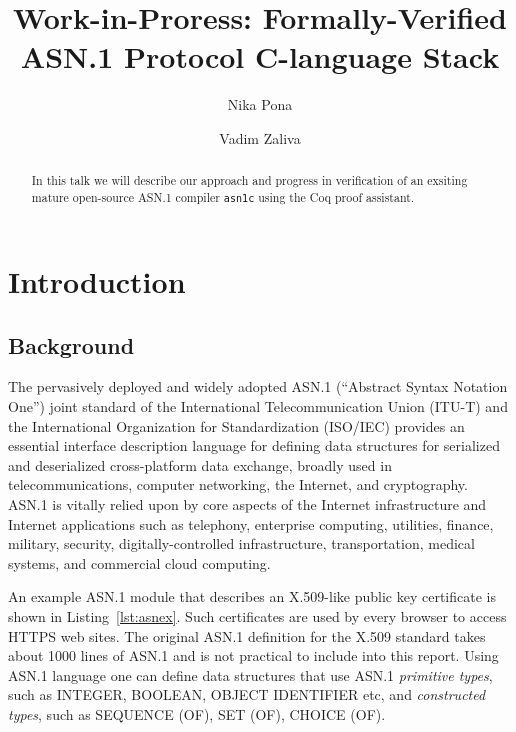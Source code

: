 \documentclass[acmsmall,nonacm]{acmart}
\begin{document}
\title{Work-in-Proress: Formally-Verified ASN.1 Protocol C-language Stack}

\author{Nika Pona}
\author{Vadim Zaliva}

\begin{abstract}
In this talk we will describe our approach and progress in verification of an exsiting mature open-source ASN.1 compiler \texttt{asn1c} using the Coq proof assistant. 
\end{abstract}

\maketitle

\tableofcontents

\section{Introduction}

\subsection{Background}

The pervasively deployed and widely adopted ASN.1 (``Abstract Syntax
Notation One'') \cite{ASN1Intro} joint standard of the International
Telecommunication Union (ITU-T) and the International Organization for
Standardization (ISO/IEC) provides an essential interface description
language for defining data structures for serialized and deserialized
cross-platform data exchange, broadly used in telecommunications,
computer networking, the Internet, and cryptography. ASN.1 is
vitally relied upon by core aspects of the Internet infrastructure and
Internet applications such as telephony, enterprise computing,
utilities, finance, military, security, digitally-controlled
infrastructure, transportation, medical systems, and commercial cloud
computing.

An example ASN.1 module that describes an X.509-like public key certificate
is shown in Listing~\ref{lst:asnex}.
Such certificates are used by every browser to access HTTPS web sites.
The original ASN.1 definition for the X.509 standard takes about 1000 lines
of ASN.1 and is not practical to include into this report. Using ASN.1 language one can define data structures that use ASN.1 {\it primitive types}, such as INTEGER, BOOLEAN, OBJECT IDENTIFIER etc, and {\it constructed types}, such as SEQUENCE (OF), SET (OF), CHOICE (OF).
\end{document}
